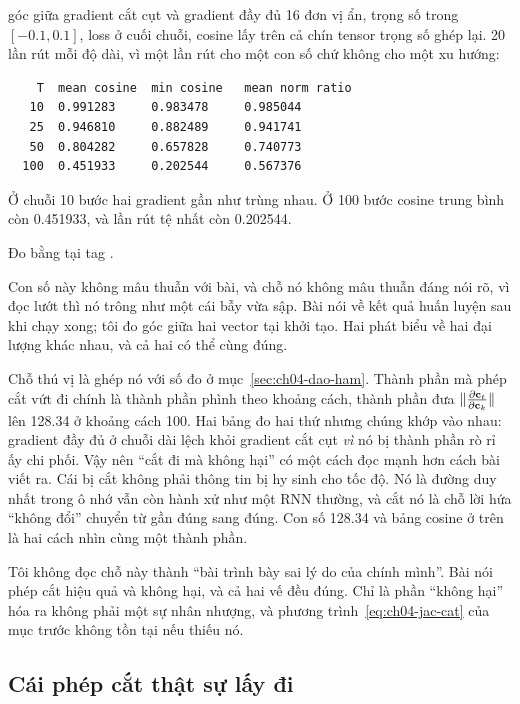 \begin{measured}{góc giữa gradient cắt cụt và gradient đầy đủ}
16 đơn vị ẩn, trọng số trong \([-0.1, 0.1]\), loss ở cuối chuỗi, cosine lấy
trên cả chín tensor trọng số ghép lại. 20 lần rút mỗi độ dài, vì một lần rút
cho một con số chứ không cho một xu hướng:

\begin{verbatim}
    T  mean cosine  min cosine   mean norm ratio
   10  0.991283     0.983478     0.985044
   25  0.946810     0.882489     0.941741
   50  0.804282     0.657828     0.740773
  100  0.451933     0.202544     0.567376
\end{verbatim}

Ở chuỗi 10 bước hai gradient gần như trùng nhau. Ở 100 bước cosine trung bình
còn 0.451933, và lần rút tệ nhất còn 0.202544.

Đo bằng  tại tag .
\end{measured}

Con số này không mâu thuẫn với bài, và chỗ nó không mâu thuẫn đáng nói rõ, vì
đọc lướt thì nó trông như một cái bẫy vừa sập. Bài nói về kết quả huấn luyện
sau khi chạy xong; tôi đo góc giữa hai vector tại khởi tạo. Hai phát biểu về
hai đại lượng khác nhau, và cả hai có thể cùng đúng.

Chỗ thú vị là ghép nó với số đo ở mục~\ref{sec:ch04-dao-ham}. Thành phần mà
phép cắt vứt đi chính là thành phần phình theo khoảng cách, thành phần đưa
\(\lVert \frac{\partial \mathbf{c}_t}{\partial \mathbf{c}_k} \rVert\) lên 128.34 ở khoảng cách 100. Hai bảng
đo hai thứ nhưng chúng khớp vào nhau: gradient đầy đủ ở chuỗi dài lệch khỏi
gradient cắt cụt \emph{vì} nó bị thành phần rò rỉ ấy chi phối. Vậy nên
\enquote{cắt đi mà không hại} có một cách đọc mạnh hơn cách bài viết ra. Cái bị
cắt không phải thông tin bị hy sinh cho tốc độ. Nó là đường duy nhất trong ô
nhớ vẫn còn hành xử như một RNN thường, và cắt nó là chỗ lời hứa
\enquote{không đổi} chuyển từ gần đúng sang đúng. Con số 128.34 và bảng cosine
ở trên là hai cách nhìn cùng một thành phần.

Tôi không đọc chỗ này thành \enquote{bài trình bày sai lý do của chính mình}.
Bài nói phép cắt hiệu quả và không hại, và cả hai vế đều đúng. Chỉ là phần
\enquote{không hại} hóa ra không phải một sự nhân nhượng, và
phương trình~\eqref{eq:ch04-jac-cat} của mục trước không tồn tại nếu thiếu nó.

\subsection*{Cái phép cắt thật sự lấy đi}


